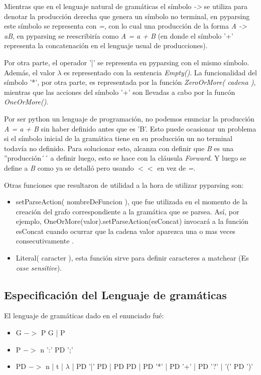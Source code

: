 \documentclass[a4paper]{report}
\begin{document}
Mientras que en el lenguaje natural de gramáticas el símbolo \emph{->} se utiliza para denotar la producción derecha que genera un símbolo no terminal, en pyparsing este símbolo se representa con \emph{=}, con lo cual una producción de la forma \emph{A -> aB}, en pyparsing se reescribiría como \emph{A = a + B} (en donde el símbolo '+' representa la concatenación en el lenguaje usual de producciones). 

Por otra parte, el operador '|' se representa en pyparsing con el mismo símbolo. Además, el valor $\lambda$ es representado con la sentencia \emph{Empty()}. La funcionalidad del símbolo '*', por otra parte, es representada por la función \emph{ZeroOrMore( cadena )}, mientras que las acciones del símbolo '+' son llevadas a cabo por la funcón \emph{OneOrMore()}. 

Por ser python un lenguaje de programación, no podemos enunciar la producción \emph{A = a + B} sin haber definido antes que es 'B'. Esto puede ocasionar un problema si el símbolo inicial de la gramática tiene en su producción un no terminal todavía no definido. Para solucionar esto, alcanza con definir que \emph{B} es una ''producción´´ a definir luego, esto se hace con la cláusula \emph{Forward}. Y luego se define a \emph{B} como ya se detalló pero usando $<<$ en vez de \emph{=}.

Otras funciones que resultaron de utilidad a la hora de utilizar pyparsing son:

\begin{itemize}
	\item setParseAction( nombreDeFuncion ), que fue utilizada en el momento de la creación del grafo correspondiente a la gramática que se parsea. Así, por ejemplo, OneOrMore(valor).setParseAction(esConcat) invocará a la función esConcat cuando ocurrar que la cadena valor aparezca una o mas veces consecutivamente .
	\item Literal( caracter ), esta función sirve para definir caracteres a matchear (Es \emph{case sensitive}). 
\end{itemize}

\subsection*{Especificación del Lenguaje de gramáticas}

El lenguaje de gramáticas dado en el enunciado fué:

\begin{itemize}
\item G $->$ P G | P
\item P $->$ n ':' PD ';'
\item PD $->$ n | t | $\lambda$ | PD '|' PD | PD PD | PD '*' | PD '+' | PD '?' | '(' PD ')'
\end{itemize}
\end{document}
